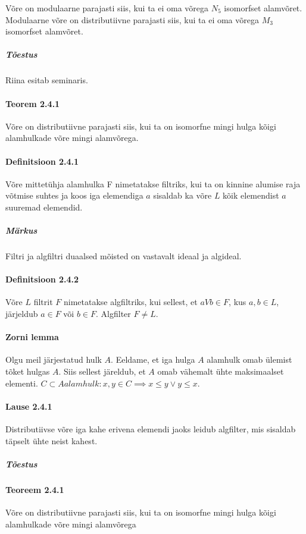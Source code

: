 \documentclass[12pt]{report}
\numberwithin{equation}{section}
\theoremstyle{definition}
\theoremstyle{plain}
\begin{document}
Võre on modulaarne parajasti siis, kui ta ei oma võrega $N_5$ isomorfset alamvõret. Modulaarne võre on distributiivne parajasti siis, kui ta ei oma võrega $M_3$ isomorfset alamvõret.

\subparagraph{Tõestus}

Riina esitab seminaris.

\paragraph{Teorem 2.4.1}
Võre on distributiivne parajasti siis, kui ta on isomorfne mingi hulga kõigi alamhulkade võre mingi alamvõrega. 

\paragraph{Definitsioon 2.4.1}
Võre mittetühja alamhulka F nimetatakse filtriks, kui ta on kinnine alumise raja võtmise suhtes ja koos iga elemendiga $a$ sisaldab ka võre $L$ kõik elemendist $a$ suuremad elemendid.

\subparagraph{Märkus}
Filtri ja algfiltri duaalsed mõisted on vastavalt ideaal ja algideal.

\paragraph{Definitsioon 2.4.2}
Võre $L$ filtrit $F$ nimetatakse algfiltriks, kui sellest, et $a V b \in F$, kus $a,b \in L$, järjeldub
$a \in F$ või $b \in F$. Algfilter $F \neq L$. 

\paragraph{Zorni lemma}
Olgu meil järjestatud hulk $A$. Eeldame, et iga hulga $A$ alamhulk omab ülemist tõket hulgas $A$. Siis sellest järeldub, et $A$ omab vähemalt ühte maksimaalset elementi. $C \subset A alamhulk: x,y \in C \implies x \leq y \lor y \leq x$.

\paragraph{Lause 2.4.1}
Distributiivse võre iga kahe erivena elemendi jaoks leidub algfilter, mis sisaldab täpselt ühte neist kahest. 

\subparagraph{Tõestus}


\paragraph{Teoreem 2.4.1}
Võre on distributiivne parajasti siis, kui ta on isomorfne mingi hulga kõigi alamhulkade võre mingi alamvõrega
\end{document}
